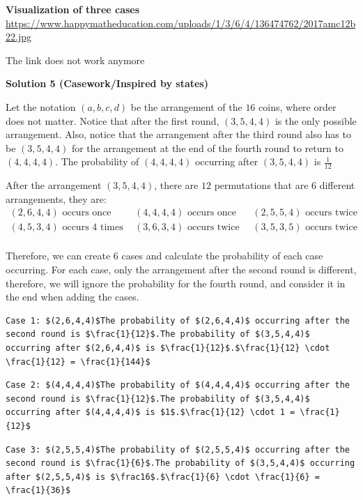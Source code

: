 \begin{enumerate}
 \textbf{Visualization of three cases} \href{https://www.happymatheducation.com/uploads/1/3/6/4/136474762/2017amc12b22.jpg}{https://www.happymatheducation.com/uploads/1/3/6/4/136474762/2017amc12b22.jpg}

 The link does not work anymore

 



\textbf{Solution 5 (Casework/Inspired by states)}

Let the notation $(a,b,c,d)$ be the arrangement of the $16$ coins, where order does not matter. Notice that after the first round, $(3,5,4,4)$ is the only possible arrangement. Also, notice that the arrangement after the third round also has to be $(3,5,4,4)$ for the arrangement at the end of the fourth round to return to $(4,4,4,4)$. The probability of $(4,4,4,4)$ occurring after $(3,5,4,4)$ is $\frac{1}{12}$

 After the arrangement $(3,5,4,4)$, there are $12$ permutations that are $6$ different arrangements, they are:
 \begin{align*} (2,6,4,4) \text{ occurs once} \quad & (4,4,4,4) \text{ occurs once} \quad & (2,5,5,4) \text{ occurs twice}\\ (4,5,3,4) \text{ occurs 4 times} \quad & (3,6,3,4) \text{ occurs twice} \quad & (3,5,3,5) \text{ occurs twice}\\ \end{align*}


 Therefore, we can create $6$ cases and calculate the probability of each case occurring. For each case, only the arrangement after the second round is different, therefore, we will ignore the probability for the fourth round, and consider it in the end when adding the cases.

 \begin{verbatim}
Case 1: $(2,6,4,4)$The probability of $(2,6,4,4)$ occurring after the second round is $\frac{1}{12}$.The probability of $(3,5,4,4)$ occurring after $(2,6,4,4)$ is $\frac{1}{12}$.$\frac{1}{12} \cdot \frac{1}{12} = \frac{1}{144}$
\end{verbatim}

\begin{verbatim}
Case 2: $(4,4,4,4)$The probability of $(4,4,4,4)$ occurring after the second round is $\frac{1}{12}$.The probability of $(3,5,4,4)$ occurring after $(4,4,4,4)$ is $1$.$\frac{1}{12} \cdot 1 = \frac{1}{12}$
\end{verbatim}

\begin{verbatim}
Case 3: $(2,5,5,4)$The probability of $(2,5,5,4)$ occurring after the second round is $\frac{1}{6}$.The probability of $(3,5,4,4)$ occurring after $(2,5,5,4)$ is $\frac16$.$\frac{1}{6} \cdot \frac{1}{6} = \frac{1}{36}$
\end{verbatim}


\end{enumerate}
